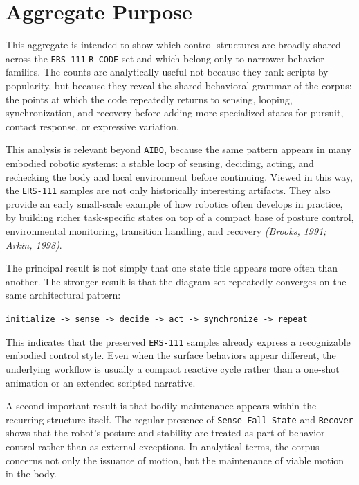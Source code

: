 \documentclass[11pt]{article}
\begin{document}
\section*{Aggregate Purpose}

This aggregate is intended to show which control structures are broadly
shared across the \texttt{ERS-111} \texttt{R-CODE} set and which belong
only to narrower behavior families. The counts are analytically useful
not because they rank scripts by popularity, but because they reveal
the shared behavioral grammar of the corpus: the points at which the
code repeatedly returns to sensing, looping, synchronization, and
recovery before adding more specialized states for pursuit, contact
response, or expressive variation.

This analysis is relevant beyond \texttt{AIBO}, because the same
pattern appears in many embodied robotic systems: a stable loop of
sensing, deciding, acting, and rechecking the body and local
environment before continuing. Viewed in this way, the
\texttt{ERS-111} samples are not only historically interesting
artifacts. They also provide an early small-scale example of how
robotics often develops in practice, by building richer task-specific
states on top of a compact base of posture control, environmental
monitoring, transition handling, and recovery \textit{(Brooks, 1991; Arkin, 1998)}.

The principal result is not simply that one state title appears more
often than another. The stronger result is that the diagram set
repeatedly converges on the same architectural pattern:

\begin{center}
\texttt{initialize -> sense -> decide -> act -> synchronize -> repeat}
\end{center}

This indicates that the preserved \texttt{ERS-111} samples already
express a recognizable embodied control style. Even when the surface
behaviors appear different, the underlying workflow is usually a
compact reactive cycle rather than a one-shot animation or an extended
scripted narrative.

A second important result is that bodily maintenance appears within the
recurring structure itself. The regular presence of \texttt{Sense Fall
State} and \texttt{Recover} shows that the robot's posture and
stability are treated as part of behavior control rather than as
external exceptions. In analytical terms, the corpus concerns not only
the issuance of motion, but the maintenance of viable motion in the
body.
\end{document}
